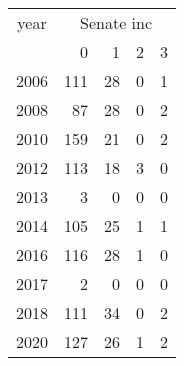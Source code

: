 \footnotesize\begin{tabular}[t]{lrrrr}
\toprule
\multicolumn{1}{c}{year} & \multicolumn{4}{c}{Senate inc} \\
\cmidrule(l{3pt}r{3pt}){1-1} \cmidrule(l{3pt}r{3pt}){2-5}
  & 0 & 1 & 2 & 3\\
\midrule
2006 & 111 & 28 & 0 & 1\\
2008 & 87 & 28 & 0 & 2\\
2010 & 159 & 21 & 0 & 2\\
2012 & 113 & 18 & 3 & 0\\
2013 & 3 & 0 & 0 & 0\\
2014 & 105 & 25 & 1 & 1\\
2016 & 116 & 28 & 1 & 0\\
2017 & 2 & 0 & 0 & 0\\
2018 & 111 & 34 & 0 & 2\\
2020 & 127 & 26 & 1 & 2\\
\bottomrule
\end{tabular}
